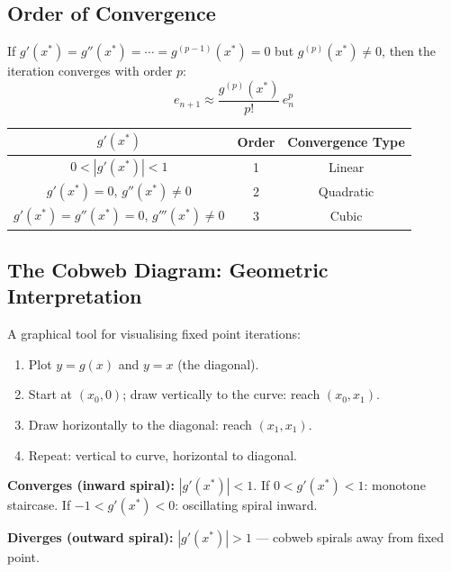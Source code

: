 \documentclass[12pt]{article}
\newcommand{\hcell}[1]{\textbf{\color{white}#1}}
\begin{document}
\bigskip

\subsection*{Order of Convergence}

\begin{thmbox}
If $g'(x^*) = g''(x^*) = \cdots = g^{(p-1)}(x^*) = 0$ but $g^{(p)}(x^*) \neq 0$, then the iteration converges with order $p$:
\[
  e_{n+1} \approx \frac{g^{(p)}(x^*)}{p!}\,e_n^p
\]
\begin{center}
\begin{tabular}{ccc}
\toprule
\rowcolor{primary}
\hcell{$g'(x^*)$} & \hcell{Order} & \hcell{Convergence Type} \\
\midrule
\rowcolor{amberbg}
$0 < |g'(x^*)| < 1$ & 1 & Linear \\
$g'(x^*) = 0$, $g''(x^*) \neq 0$ & 2 & Quadratic \\
\rowcolor{amberbg}
$g'(x^*)=g''(x^*)=0$, $g'''(x^*)\neq 0$ & 3 & Cubic \\
\bottomrule
\end{tabular}
\end{center}
\end{thmbox}

\bigskip

\subsection*{The Cobweb Diagram: Geometric Interpretation}

\begin{defbox}
A graphical tool for visualising fixed point iterations:
\begin{enumerate}[noitemsep]
  \item Plot $y=g(x)$ and $y=x$ (the diagonal).
  \item Start at $(x_0,0)$; draw vertically to the curve: reach $(x_0,x_1)$.
  \item Draw horizontally to the diagonal: reach $(x_1,x_1)$.
  \item Repeat: vertical to curve, horizontal to diagonal.
\end{enumerate}
\textbf{Converges (inward spiral):} $|g'(x^*)|<1$. If $0<g'(x^*)<1$: monotone staircase. If $-1<g'(x^*)<0$: oscillating spiral inward.

\textbf{Diverges (outward spiral):} $|g'(x^*)|>1$ — cobweb spirals away from fixed point.
\end{defbox}
\end{document}
